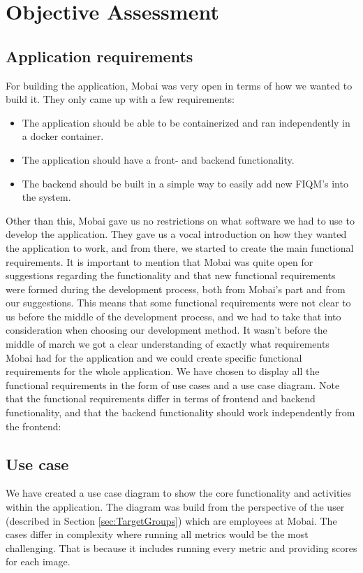\chapter{Objective Assessment}
\label{chap:objective}

\section{Application requirements}
For building the application, Mobai was very open in terms of how we wanted to build it. They only came up with a few requirements:
\begin{itemize}
    \item The application should be able to be containerized and ran independently in a docker container.
    \item The application should have a front- and backend functionality.
    \item The backend should be built in a simple way to easily add new FIQM's into the system.
\end{itemize}
Other than this, Mobai gave us no restrictions on what software we had to use to develop the application. They gave us a vocal introduction on how they wanted the application to work, and from there, we started to create the main functional requirements. It is important to mention that Mobai was quite open for suggestions regarding the functionality and that new functional requirements were formed during the development process, both from Mobai's part and from our suggestions. This means that some functional requirements were not clear to us before the middle of the development process, and we had to take that into consideration when choosing our development method. It wasn't before the middle of march we got a clear understanding of exactly what requirements Mobai had for the application and we could create specific functional requirements for the whole application. We have chosen to display all the functional requirements in the form of use cases and a use case diagram. Note that the functional requirements differ in terms of frontend and backend functionality, and that the backend functionality should work independently from the frontend:         

\newpage

\section{Use case}
We have created a use case diagram to show the core functionality and activities within the application. The diagram was build from the perspective of the user (described in Section \ref{sec:TargetGroups}) which are employees at Mobai. The cases differ in complexity where running all metrics would be the most challenging. That is because it includes running every metric and providing scores for each image. 

